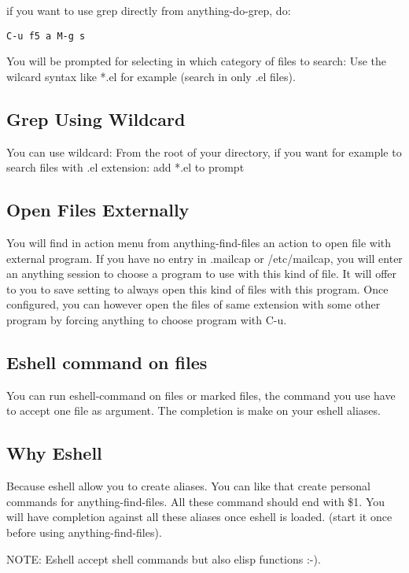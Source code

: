 \documentclass[a4paper,11pt]{article}
\begin{document}
if you want to use grep directly from anything-do-grep, do:

\begin{verbatim}
C-u f5 a M-g s
\end{verbatim}

You will be prompted for selecting in which category of files to search:
Use the wilcard syntax like *.el for example (search in only .el files).


\subsection{Grep Using Wildcard}
\label{sec:grep-using-wildcard}
You can use wildcard:
From the root of your directory, if you want for example to search files with .el extension:
add *.el to prompt

\subsection{Open Files Externally}
\label{sec:open-files-extern}
You will find in action menu from anything-find-files an action to open file with external program.
If you have no entry in .mailcap or /etc/mailcap, you will enter an anything session to choose a program
to use with this kind of file.
It will offer to you to save setting to always open this kind of files with this program.
Once configured, you can however open the files of same extension with some other program by forcing anything
to choose program with C-u.

\subsection{Eshell command on files}
\label{sec:eshell-command-files}
You can run eshell-command on files or marked files, the command you use have to accept
one file as argument.
The completion is make on your eshell aliases.

\subsection{Why Eshell}
\label{sec:why-eshell}
Because eshell allow you to create aliases.
You can like that create personal commands for anything-find-files.
All these command should end with \$1.
You will have completion against all these aliases once eshell is loaded.
(start it once before using anything-find-files).

NOTE: Eshell accept shell commands but also elisp functions :-).
\end{document}
